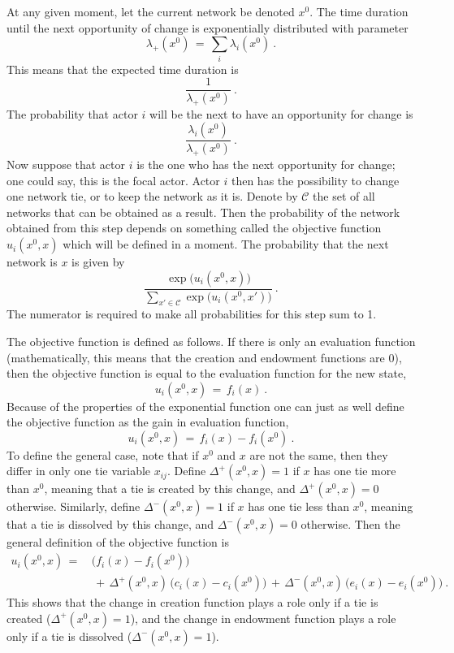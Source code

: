 \documentclass[a4paper,fleqn,11pt]{article}
\newcommand{\+}{\, + \,}
\begin{document}
At any given moment, let the current network be denoted $x^0$.
The time duration until the next opportunity of change
is exponentially distributed with parameter
\[
  \lambda_+(x^0) \,=\, \sum_i \lambda_i(x^0) \ .
\]
This means that the expected time duration is
\[
   \frac{1}{\lambda_+(x^0)} \ .
\]
The probability that actor $i$ will be the next to
have an opportunity for change is
\[
  \frac{\lambda_i(x^0)}{\lambda_+(x^0)} \ .
\]
Now suppose that actor $i$ is the one who has the next opportunity
for change; one could say, this is the focal actor.
Actor $i$ then has the possibility to change one network tie,
or to keep the network as it is.
Denote by $\mathcal C$ the set of all networks that can be obtained
as a result.
Then the probability of the network obtained from this step depends on
something called the objective function $u_i(x^0, x)$ which will be defined
in a moment.
The probability that the next network is $x$ is given by
\begin{equation}
     \frac{\exp(u_i(x^0, x)\big)}
          {\sum_{x' \in \mathcal C} \exp\big(u_i(x^0, x')\big)} \ . \label{probab}
\end{equation}
The numerator is required to make all probabilities for this step sum to 1.

The objective function is defined as follows.
If there is only an evaluation function (mathematically, this means that
the creation and endowment functions are 0), then
the objective function is equal to the evaluation function for the new state,
\[
   u_i(x^0, x) \,=\, f_i(x) \ .
\]
Because of the properties of the exponential function one can just as
well define the objective function as the gain in evaluation function,
\begin{equation}
   u_i(x^0, x) \,=\, f_i(x) - f_i(x^0) \ .    \label{gain}
\end{equation}
To define the general case, note that if $x^0$ and $x$ are not the same,
then they differ in only one tie variable $x_{ij}$.
Define  $\Delta^+(x^0, x) = 1$ if $x$ has one tie more than $x^0$,
meaning that a tie is created by this change, and $\Delta^+(x^0, x) = 0$
otherwise.
Similarly, define  $\Delta^-(x^0, x) = 1$ if $x$ has one tie less than $x^0$,
meaning that a tie is dissolved by this change, and $\Delta^-(x^0, x) = 0$
otherwise.
Then the general definition of the objective function is
\begin{align}
   u_i(x^0, x)  \,=\,  \label{u_i}   &
      \big(f_i(x) -  f_i(x^0)\big)  \\
                &   \,+\,   \Delta^+(x^0, x)\,\big(c_i(x) - c_i(x^0)\big)
                   \,+\,  \Delta^-(x^0, x)\,\big(e_i(x) - e_i(x^0)\big)    \ . \nonumber
\end{align}
This shows that the change in creation function plays a role
only if a tie is created ($\Delta^+(x^0,x) = 1$), and the change in
endowment function plays a role
only if a tie is dissolved ($\Delta^-(x^0,x) = 1$).
\end{document}

